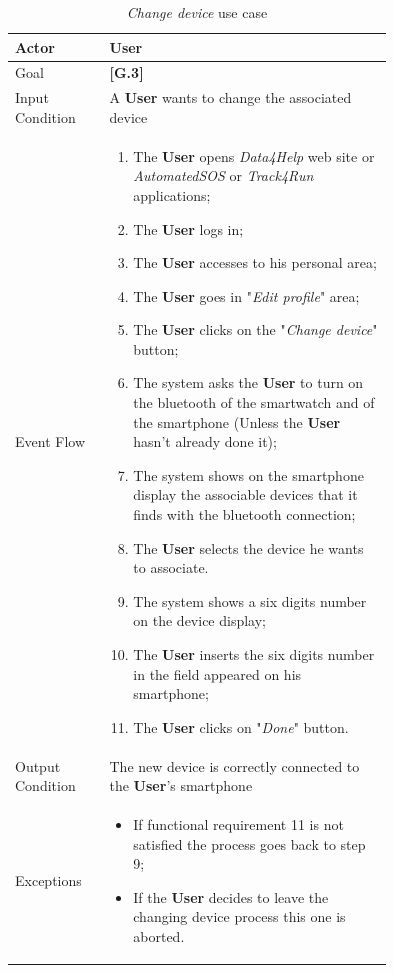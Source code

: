 \begin{center}
\begin{table}
\begin{tabular}{ | l | p{0.75\linewidth} | }
  \hline
    Actor & \textbf{User} \\ \hline
    Goal & \textbf{[G.3]} \\ \hline
    Input Condition & A \textbf{User} wants to change the associated device\\ \hline
    Event Flow & \begin{minipage}[t]{0.7\textwidth}
      \begin{enumerate}
        \item The \textbf{User} opens \textit{Data4Help} web site or \textit{AutomatedSOS} or \textit{Track4Run} applications;
        \item The \textbf{User} logs in;
        \item The \textbf{User} accesses to his personal area;
        \item The \textbf{User} goes in "\textit{Edit profile}" area;
        \item The \textbf{User} clicks on the "\textit{Change device}" button;
        \item The system asks the \textbf{User} to turn on the bluetooth of the smartwatch and of the smartphone (Unless the \textbf{User} hasn't already done it);
        \item The system shows on the smartphone display the associable devices that it finds with the bluetooth connection;
        \item The \textbf{User} selects the device he wants to associate.
        \item The system shows a six digits number on the device display;
        \item The \textbf{User} inserts the six digits number in the field appeared on his smartphone;
        \item The \textbf{User} clicks on "\textit{Done}" button.
      \end{enumerate}
    \smallskip
  \end{minipage} \\ \hline
  Output Condition & The new device is correctly connected to the \textbf{User}'s smartphone \\ \hline
  Exceptions & \begin{minipage}[t]{0.7\textwidth}
    \begin{itemize}
      \smallskip
      \item If functional requirement 11 is not satisfied the process goes back to step 9;
      \item If the \textbf{User} decides to leave the changing device process this one is aborted.
    \end{itemize}
    \smallskip
  \end{minipage}  \\ \hline
\end{tabular}
\caption{\textit{Change device} use case}
\label{table:changeDeviceTable}
\end{table}
\end{center}

